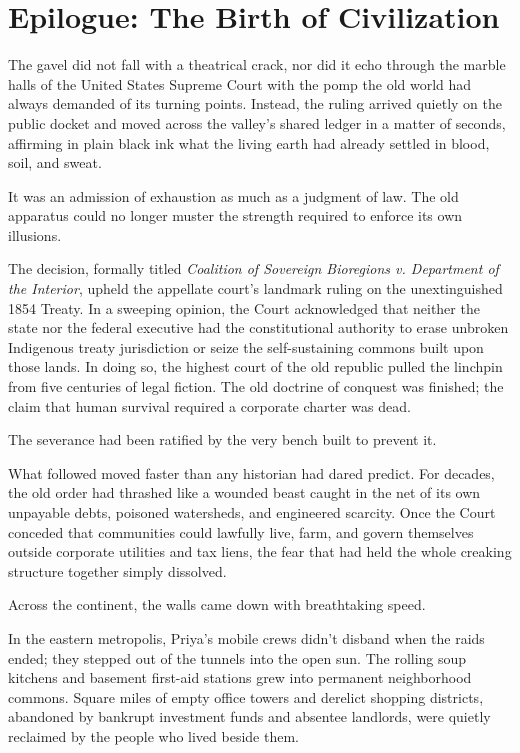 \chapter*{Epilogue: The Birth of Civilization}


The gavel did not fall with a theatrical crack, nor did it echo through the marble halls of the United States Supreme Court with the pomp the old world had always demanded of its turning points. Instead, the ruling arrived quietly on the public docket and moved across the valley’s shared ledger in a matter of seconds, affirming in plain black ink what the living earth had already settled in blood, soil, and sweat.

It was an admission of exhaustion as much as a judgment of law. The old apparatus could no longer muster the strength required to enforce its own illusions.

The decision, formally titled \textit{Coalition of Sovereign Bioregions v. Department of the Interior}, upheld the appellate court's landmark ruling on the unextinguished 1854 Treaty. In a sweeping opinion, the Court acknowledged that neither the state nor the federal executive had the constitutional authority to erase unbroken Indigenous treaty jurisdiction or seize the self-sustaining commons built upon those lands. In doing so, the highest court of the old republic pulled the linchpin from five centuries of legal fiction. The old doctrine of conquest was finished; the claim that human survival required a corporate charter was dead.

The severance had been ratified by the very bench built to prevent it.

What followed moved faster than any historian had dared predict. For decades, the old order had thrashed like a wounded beast caught in the net of its own unpayable debts, poisoned watersheds, and engineered scarcity. Once the Court conceded that communities could lawfully live, farm, and govern themselves outside corporate utilities and tax liens, the fear that had held the whole creaking structure together simply dissolved. 

Across the continent, the walls came down with breathtaking speed. 

In the eastern metropolis, Priya’s mobile crews didn't disband when the raids ended; they stepped out of the tunnels into the open sun. The rolling soup kitchens and basement first-aid stations grew into permanent neighborhood commons. Square miles of empty office towers and derelict shopping districts, abandoned by bankrupt investment funds and absentee landlords, were quietly reclaimed by the people who lived beside them. 


